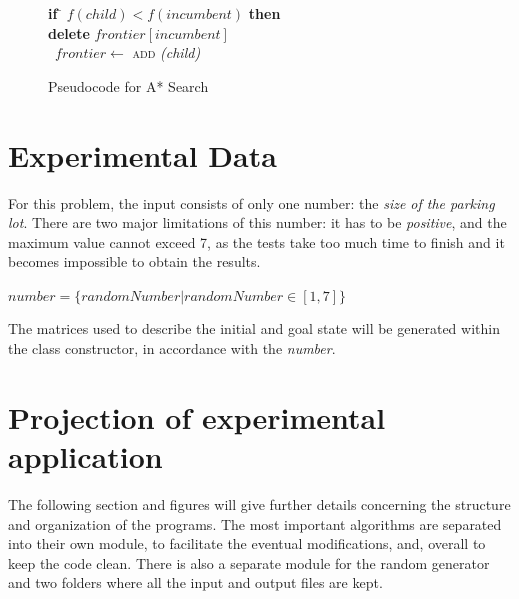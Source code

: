 \documentclass{article}
\begin{document}
\begin{figure}[t]
\begin{center}
\begin{tabbing}
\indent \> \> \> \> \textbf{if} \= $f(child) < f(incumbent)$ \textbf{then} \\

\indent \> \> \> \> \> \textbf{delete} $frontier[incumbent]$ \\

\indent \> \> \> \> \> \ $frontier \leftarrow $ \textsc{add} \emph{(child)} \\

\end{tabbing}
\caption{Pseudocode for A* Search}
\label{fig_alg_ex}
\end{center}
\end{figure}


\section{Experimental Data}
For this problem, the input consists of only one number: the \emph{size of the parking lot}. There are two major limitations of this number: it has to be \emph{positive}, and the maximum value cannot exceed 7, as the tests take too much time to finish and it becomes impossible to obtain the results.

\begin{center}
    $number = \{ randomNumber | randomNumber \in [1, 7] \}$
\end{center}

The matrices used to describe the initial and goal state will be generated within the class constructor, in accordance with the \emph{number}.

\section{Projection of experimental application}


The following section and figures will give further details concerning the structure and organization of the programs. The most important algorithms are separated into their own module, to facilitate the eventual modifications, and, overall to keep the code clean. There is also a separate module for the random generator and two folders where all the input and output files are kept.

\newpage
\end{document}
